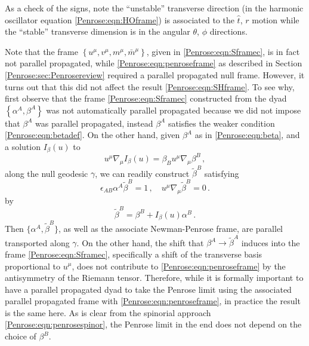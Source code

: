As a check of the signs, note the ``unstable'' transverse direction (in the harmonic oscillator equation \eqref{Penrose:eqn:HOframe}) is associated to the $\hat{t}$, $r$ motion while the ``stable'' transverse dimension is in the angular $\theta$, $\phi$ directions.

Note that the frame $\left\lbrace u^{\mu}, v^{\mu} , m^{\mu} , \bar{m}^{\mu}  \right\rbrace$, given in \eqref{Penrose:eqn:Sframec}, is in fact not parallel propagated, while \eqref{Penrose:eqn:penroseframe} as described in Section \ref{Penrose:sec:Penrosereview} required a parallel propagated null frame. However, it turns out that this did not affect the result \eqref{Penrose:eqn:SHframe}. To see why, first observe that the frame \eqref{Penrose:eqn:Sframec} constructed from the dyad $\left\lbrace \alpha^A, \beta^A \right\rbrace$ was not automatically parallel propagated because we did not impose that $\beta^A$ was parallel propagated, instead $\beta^A$ satisfies the weaker condition \eqref{Penrose:eqn:betadef}. On the other hand, given $\beta^A$  as in \eqref{Penrose:eqn:beta}, and a solution $I_{\beta}(u)$ to
\begin{equation}\label{Penrose:eqn:Idef}
u^{\mu}\nabla_{\mu} I_{\beta}(u) = \beta_B u^{\mu}\nabla_{\mu}\beta^B  \, ,
\end{equation}
along the null geodesic $\gamma$, we can readily construct $\tilde{\beta}^B$ satisfying \begin{equation}\label{Penrose:eqn:betadef2}
\epsilon_{AB} \alpha^A \tilde{\beta}^B = 1 \, , \quad  u^{\mu}\nabla_{\mu}\tilde{\beta}^B = 0 \, . 
\end{equation}
 by
\begin{equation}\label{Penrose:eqn:ppdyad}
\tilde{\beta}^B =  \beta^B +  I_{\beta}(u) \alpha^B \, .
\end{equation}
Then $\lbrace \alpha^A,\tilde{\beta}^B\rbrace$, as well as the associate Newman-Penrose frame, are parallel transported along $\gamma$. On the other hand, the shift that $\beta^A \to \tilde{\beta}^A$ induces into the frame \eqref{Penrose:eqn:Sframec}, specifically a shift of the transverse basis proportional to $u^{\mu}$, does not contribute to \eqref{Penrose:eqn:penroseframe} by the antisymmetry of the Riemann tensor. Therefore, while it is formally important to have a parallel propagated dyad to take the Penrose limit using the associated parallel propagated frame with \eqref{Penrose:eqn:penroseframe}, in practice the result is the same here. As is clear from the spinorial approach \eqref{Penrose:eqn:penrosespinor}, the Penrose limit in the end does not depend on the choice of $\beta^B$. 
